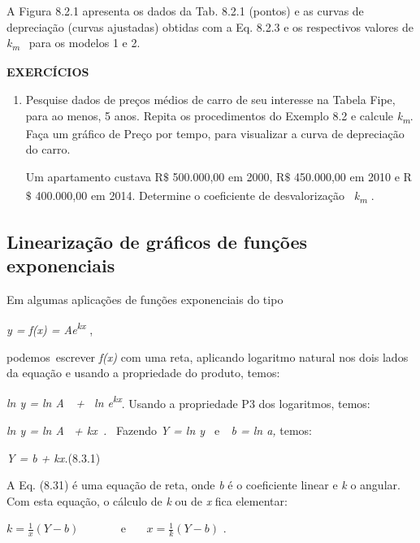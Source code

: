 A Figura 8.2.1 apresenta os dados da Tab. 8.2.1 (pontos) e as curvas de depreciação (curvas ajustadas) obtidas com a Eq. 8.2.3 e os respectivos valores de \textit{k\textsubscript{m}}~ para os modelos 1 e 2.\qedsymbol{}

\noindent\textbf{EXERCÍCIOS \thesubsection}
\begin{enumerate}[label=\thesubsection.\arabic*]
    \exitem{} Utilize a Eq. 8.2.3 para calcular o valor do carro Modelo 1 depois de 10 anos.

	\item Pesquise dados de preços médios de carro de seu interesse na Tabela Fipe, para ao menos, 5 anos. Repita os procedimentos do Exemplo 8.2 e calcule \textit{k\textsubscript{m}}. Faça um gráfico de Preço por tempo, para visualizar a curva de depreciação do carro.

	\exitem{} Um apartamento custava R$\$$  500.000,00 em 2000, R$\$$  450.000,00 em 2010 e R$\$$  400.000,00 em 2014. Determine o coeficiente de desvalorização~ \textit{k\textsubscript{m}\textsuperscript{ }}.
\end{enumerate}

\subsection{Linearização de gráficos de funções exponenciais}

Em algumas aplicações de funções exponenciais do tipo 

\textit{y = f(x) = Ae\textsuperscript{kx}} , 

podemos~escrever  \textit{f(x)} com uma reta, aplicando logaritmo natural nos dois lados da equação e usando a propriedade do produto, temos:

\textit{ln y = ln A~~+~  ln e\textsuperscript{kx}}. Usando a propriedade P3 dos logaritmos, temos:

\textit{ln y = ln A~ + kx~.~  }Fazendo\textit{ Y = ln y~ }e\textit{~~b =  ln a, }temos:

\textit{Y = b + kx.\quad \quad \quad \quad \quad \quad \quad \quad \quad }(8.3.1)

A Eq. (8.31) é uma equação de reta, onde \textit{b} é o coeficiente linear e \textit{k} o angular. Com esta equação, o cálculo de \textit{k} ou de \textit{x} fica elementar:

\( k=\frac{1}{x} \left( Y-b \right)  \) ~~~~~~ e~~~  \( x=\frac{1}{k} \left( Y-b \right)  \) .

